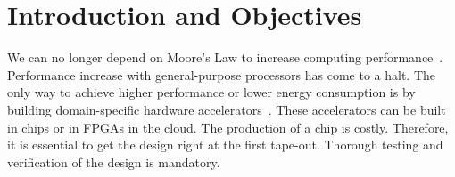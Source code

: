 \documentclass[fleqn,12pt]{article}
\begin{document}
%
%
%
%
%

\section{Introduction and Objectives}
\label{sec:objectives}

We can no longer depend on Moore's Law to increase computing performance~\cite{dark-silicon:2011}.
Performance increase with general-purpose processors has come to a halt.
The only way to achieve higher performance or lower energy consumption
is by building domain-specific hardware accelerators~\cite{domain-hw-acc:2020}.
These accelerators can be built in chips or in FPGAs in the cloud.
The production of a chip is costly. Therefore, it is essential to get
the design right at the first tape-out. Thorough testing and verification of the design is mandatory.
\end{document}
